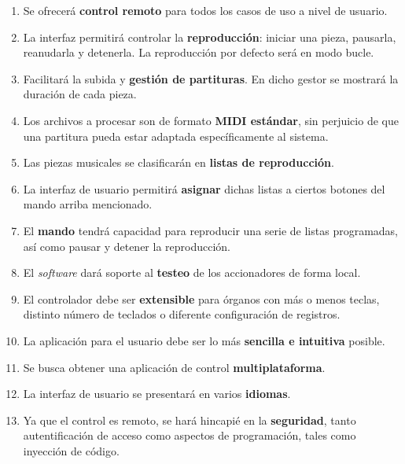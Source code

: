 \documentclass[10pt,a4paper]{article}
\begin{document}
	\begin{enumerate}
		
		\item Se ofrecerá \textbf{control remoto} para todos los casos de uso a
		nivel de usuario.
		
		\item La interfaz permitirá controlar la \textbf{reproducción}: iniciar
		una pieza, pausarla, reanudarla y detenerla. La reproducción por defecto
		será en modo bucle.
		
		\item Facilitará la subida y \textbf{gestión de partituras}. En dicho
		gestor se mostrará la duración de cada pieza.
		
		\item Los archivos a procesar son de formato \textbf{MIDI estándar}, sin
		perjuicio de que una partitura pueda estar adaptada específicamente al
		sistema.
		
		\item Las piezas musicales se clasificarán en \textbf{listas de
		reproducción}.
		
		\item La interfaz de usuario permitirá \textbf{asignar} dichas listas a
		ciertos botones del mando arriba mencionado.
		
		\item El \textbf{mando} tendrá capacidad para reproducir una serie de
		listas programadas, así como pausar y detener la reproducción.
		
		\item El \textit{software} dará soporte al \textbf{testeo} de los
		accionadores de forma local.
		
		\item El controlador debe ser \textbf{extensible} para órganos con más o
		menos teclas, distinto número de teclados o diferente configuración de
		registros.
		
		\item La aplicación para el usuario debe ser lo más \textbf{sencilla e
		intuitiva} posible.
		
		\item Se busca obtener una aplicación de control
		\textbf{multiplataforma}.
		
		\item La interfaz de usuario se presentará en varios \textbf{idiomas}.
		
		\item Ya que el control es remoto, se hará hincapié en la
		\textbf{seguridad}, tanto autentificación de acceso como aspectos de
		programación, tales como inyección de código.
		
	\end{enumerate}
	
\end{document}
